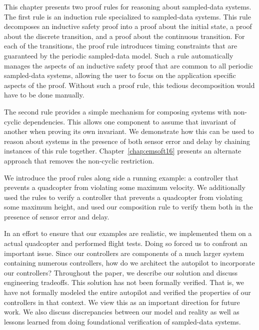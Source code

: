 This chapter presents two proof rules for reasoning about sampled-data
systems. The first rule is an induction rule specialized to sampled-data
systems. This rule decomposes an inductive safety proof into a proof about
the initial state, a proof about the discrete transition, and a proof about
the continuous transition. For each of the transitions, the proof rule
introduces timing constraints that are guaranteed by the periodic
sampled-data model. Such a rule automatically manages the aspects of an
inductive safety proof that are common to all periodic sampled-data
systems, allowing the user to focus on the application specific aspects of
the proof. Without such a proof rule, this tedious decomposition would have
to be done manually.

The second rule provides a simple mechanism for composing systems with
non-cyclic dependencies. This allows one component to assume that invariant
of another when proving its own invariant. We demonstrate how this can be
used to reason about systems in the presence of both sensor error and delay
by chaining instances of this rule together. Chapter~\ref{chap:emsoft16}
presents an alternate approach that removes the non-cyclic restriction.

We introduce the proof rules along side a running example: a controller
that prevents a quadcopter from violating some maximum velocity.  We
additionally used the rules to verify a controller that prevents a
quadcopter from violating some maximum height, and used our composition
rule to verify them both in the presence of sensor error and delay.

In an effort to ensure that our examples are realistic, we implemented them
on a actual quadcopter and performed flight tests. Doing so forced us to
confront an important issue. Since our controllers are components of a much
larger system containing numerous controllers, how do we architect the
autopilot to incorporate our controllers? Throughout the paper, we describe
our solution and discuss engineering tradeoffs. This solution has not been
formally verified. That is, we have not formally modeled the entire
autopilot and verified the properties of our controllers in that
context. We view this as an important direction for future work. We also
discuss discrepancies between our model and reality as well as lessons
learned from doing foundational verification of sampled-data systems.

